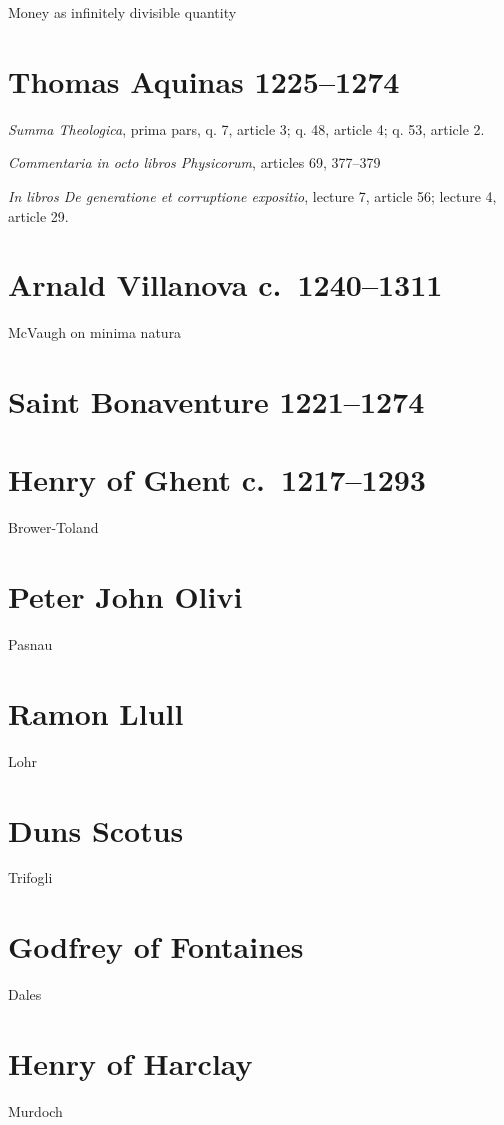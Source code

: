 \documentclass{amsart}
\theoremstyle{definition}
\begin{document}
Money as infinitely divisible quantity \cite{kaye}

\section{Thomas Aquinas 1225--1274}
{\em Summa Theologica}, prima pars, q. 7, article 3; q. 48, article 4; q. 53, article 2. 

{\em Commentaria in octo libros Physicorum}, articles 69, 377--379 \cite[pp.~188-189]{aquinas}

{\em In libros De generatione et corruptione expositio}, lecture 7, article 56; lecture 4, article 29.


\section{Arnald Villanova c.~1240--1311}
McVaugh on minima natura \cite[p.~97]{villanovaII}


\section{Saint Bonaventure 1221--1274}


\section{Henry of Ghent c.~1217--1293}
Brower-Toland \cite{brower-toland}

\section{Peter John Olivi}
Pasnau \cite{pasnau}

\section{Ramon Llull}
Lohr \cite{lohr2001}

\section{Duns Scotus}
Trifogli \cite{trifogli2004}


\section{Godfrey of Fontaines}
Dales \cite[pp.~185--186, 202--203, 233, 255]{dales}

\section{Henry of Harclay}
Murdoch \cite{harclay}
\end{document}
